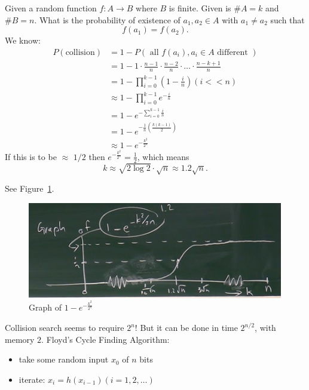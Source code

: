 \documentclass[language=english,number=]{homework}
\begin{document}
    Given a random function $f: A \to B$ where $B$ is finite.
    Given is $\# A = k$ and $\# B = n$.
    What is the probability of existence of $a_1, a_2 \in A$ with $a_1 \ne a_2$ such that
    \[
        f(a_1) = f(a_2).
    \]
    We know:
    \begin{align*}
        P(\text{collision}) &= 1 - P(\text{ all } f(a_i), a_i \in A \text{ different }) \\
        &= 1 - 1 \cdot \frac{n-1}{n} \cdot \frac{n-2}{n} \cdot \dots \cdot \frac{n-k+1}{n} \\
        &= 1 - \prod_{i=0}^{k-1} (1 - \frac{i}{n}) (i << n)  \\
        &\approx 1 - \prod_{i=0}^{k-1} e^{-\frac{i}{n}} \\
        &= 1 - e^{- \sum_{i = 0}^{k-1} \frac{i}{n}} \\
        &= 1 - e^{-\frac{1}{n}(\frac{k(k-1)}{2})} \\
        &\approx 1 - e^{- \frac{k^2}{2^n}}
    \end{align*}
    If this is to be $\approx$ $1/2$ then $e^{-\frac{k^2}{2^n}} = \frac{1}{2}$, which means
    \[
        k \approx \sqrt{2 \log 2} \cdot \sqrt{n} \approx 1.2 \sqrt{n}.
    \]

    See Figure~\ref{graph}.

    \begin{figure}
        \centering
        \includegraphics[width=\textwidth]{graph.PNG}
        \caption{Graph of $1 - e^{- \frac{k^2}{2^n}}$}
        \label{graph}
    \end{figure}

    Collision search seems to require $2^n$!
    But it can be done in time $2^{n/2}$, with memory $2$.
    Floyd's Cycle Finding Algorithm:
    \begin{itemize}
        \item take some random input $x_0$ of $n$ bits
        \item iterate: $x_i = h(x_{i-1}) (i = 1, 2, \dots)$
    \end{itemize}
\end{document}
